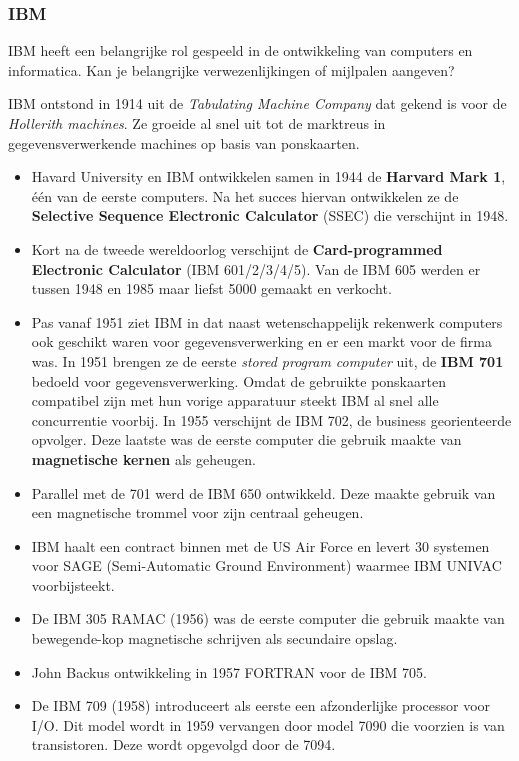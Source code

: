 \documentclass[../main.tex]{subfiles}
\begin{document}
\subsubsection{IBM}
\begin{question}
IBM heeft een belangrijke rol gespeeld in de ontwikkeling van computers en informatica. Kan je belangrijke verwezenlijkingen of mijlpalen aangeven?
\end{question}
\begin{solution}
IBM ontstond in 1914 uit de \emph{Tabulating  Machine  Company} dat gekend is voor de \emph{Hollerith machines}. Ze groeide al snel uit tot de marktreus in gegevensverwerkende machines op basis van ponskaarten.
\begin{itemize}
	\item Havard University en IBM ontwikkelen samen in 1944 de \textbf{Harvard Mark 1}, \'e\'en van de eerste computers. Na het succes hiervan ontwikkelen ze de \textbf{Selective Sequence Electronic Calculator} (SSEC) die verschijnt in 1948.
	\item Kort na de tweede wereldoorlog verschijnt de \textbf{Card-programmed Electronic Calculator} (IBM 601/2/3/4/5). Van de IBM 605 werden er tussen 1948 en 1985 maar liefst 5000 gemaakt en verkocht.
	\item Pas vanaf 1951 ziet IBM in dat naast wetenschappelijk rekenwerk computers ook geschikt waren voor gegevensverwerking en er een markt voor de firma was. In 1951 brengen ze de eerste \emph{stored program computer} uit, de \textbf{IBM 701} bedoeld voor gegevensverwerking. Omdat de gebruikte ponskaarten compatibel zijn met hun vorige apparatuur steekt IBM al snel alle concurrentie voorbij. In 1955 verschijnt de IBM 702, de business georienteerde opvolger. Deze laatste was de eerste computer die gebruik maakte van \textbf{magnetische kernen} als geheugen.
	\item Parallel met de 701 werd de IBM 650 ontwikkeld. Deze maakte gebruik van een magnetische trommel voor zijn centraal geheugen.
	\item IBM haalt een contract binnen met de US Air Force en levert 30 systemen voor SAGE (Semi-Automatic Ground Environment) waarmee IBM UNIVAC voorbijsteekt.
	\item De IBM 305 RAMAC (1956) was de eerste computer die gebruik maakte van bewegende-kop magnetische schrijven als secundaire opslag.
	\item John Backus ontwikkeling in 1957 FORTRAN voor de IBM 705.
	\item De IBM 709 (1958) introduceert als eerste een afzonderlijke processor voor I/O. Dit model wordt in 1959 vervangen door model 7090 die voorzien is van transistoren. Deze wordt opgevolgd door de 7094.

\end{itemize}
\end{solution}
\end{document}
